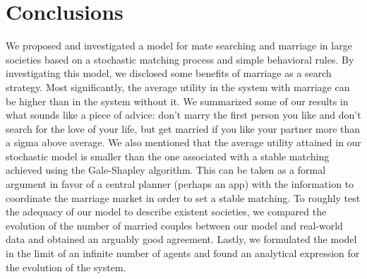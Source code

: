 \documentclass[12pt]{article}
\begin{document}





\section{Conclusions}

We proposed and investigated a model for mate searching and marriage in large societies based on a stochastic matching process and simple behavioral rules. By investigating this model, we disclosed some benefits of marriage as a search strategy. Most significantly, the average utility in the system with marriage can be higher than in the system without it. We summarized some of our results in what sounds like a piece of advice: don't marry the first person you like and don't search for the love of your life, but get married if you like your partner more than a sigma above average. We also mentioned that the average utility attained in our stochastic model is smaller than the one associated with a stable matching achieved using the Gale-Shapley algorithm. This can be taken as a formal argument in favor of a central planner (perhaps an app) with the information to coordinate the marriage market in order to set a stable matching. To roughly test the adequacy of our model to describe existent societies, we compared the evolution of the number of married couples between our model and real-world data and obtained an arguably good agreement. Lastly, we formulated the model in the limit of an infinite number of agents and found an analytical expression for the evolution of the system. 
\end{document}
